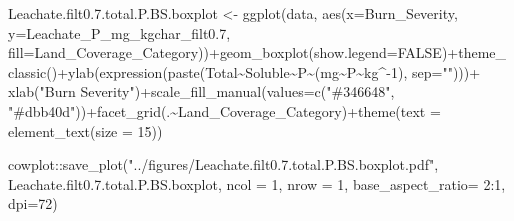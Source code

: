 \documentclass[
]{article}
\newenvironment{Shaded}{\begin{snugshade}}{\end{snugshade}}
\newcommand{\AttributeTok}[1]{\textcolor[rgb]{0.77,0.63,0.00}{#1}}
\newcommand{\ConstantTok}[1]{\textcolor[rgb]{0.00,0.00,0.00}{#1}}
\newcommand{\DecValTok}[1]{\textcolor[rgb]{0.00,0.00,0.81}{#1}}
\newcommand{\FloatTok}[1]{\textcolor[rgb]{0.00,0.00,0.81}{#1}}
\newcommand{\FunctionTok}[1]{\textcolor[rgb]{0.00,0.00,0.00}{#1}}
\newcommand{\NormalTok}[1]{#1}
\newcommand{\OtherTok}[1]{\textcolor[rgb]{0.56,0.35,0.01}{#1}}
\newcommand{\SpecialCharTok}[1]{\textcolor[rgb]{0.00,0.00,0.00}{#1}}
\newcommand{\StringTok}[1]{\textcolor[rgb]{0.31,0.60,0.02}{#1}}
\begin{document}
\begin{Shaded}
\begin{Highlighting}[]
\NormalTok{Leachate.filt0.}\FloatTok{7.}\NormalTok{total.P.BS.boxplot }\OtherTok{\textless{}{-}} \FunctionTok{ggplot}\NormalTok{(data, }\FunctionTok{aes}\NormalTok{(}\AttributeTok{x=}\NormalTok{Burn\_Severity, }\AttributeTok{y=}\NormalTok{Leachate\_P\_mg\_kgchar\_filt0}\FloatTok{.7}\NormalTok{, }\AttributeTok{fill=}\NormalTok{Land\_Coverage\_Category))}\SpecialCharTok{+}\FunctionTok{geom\_boxplot}\NormalTok{(}\AttributeTok{show.legend=}\ConstantTok{FALSE}\NormalTok{)}\SpecialCharTok{+}\FunctionTok{theme\_classic}\NormalTok{()}\SpecialCharTok{+}\FunctionTok{ylab}\NormalTok{(}\FunctionTok{expression}\NormalTok{(}\FunctionTok{paste}\NormalTok{(Total}\SpecialCharTok{\textasciitilde{}}\NormalTok{Soluble}\SpecialCharTok{\textasciitilde{}}\NormalTok{P}\SpecialCharTok{\textasciitilde{}}\NormalTok{(mg}\SpecialCharTok{\textasciitilde{}}\NormalTok{P}\SpecialCharTok{\textasciitilde{}}\NormalTok{kg}\SpecialCharTok{\^{}{-}}\DecValTok{1}\NormalTok{), }\AttributeTok{sep=}\StringTok{""}\NormalTok{)))}\SpecialCharTok{+} \FunctionTok{xlab}\NormalTok{(}\StringTok{"Burn Severity"}\NormalTok{)}\SpecialCharTok{+}\FunctionTok{scale\_fill\_manual}\NormalTok{(}\AttributeTok{values=}\FunctionTok{c}\NormalTok{(}\StringTok{"\#346648"}\NormalTok{, }\StringTok{"\#dbb40d"}\NormalTok{))}\SpecialCharTok{+}\FunctionTok{facet\_grid}\NormalTok{(.}\SpecialCharTok{\textasciitilde{}}\NormalTok{Land\_Coverage\_Category)}\SpecialCharTok{+}\FunctionTok{theme}\NormalTok{(}\AttributeTok{text =} \FunctionTok{element\_text}\NormalTok{(}\AttributeTok{size =} \DecValTok{15}\NormalTok{))}

\NormalTok{cowplot}\SpecialCharTok{::}\FunctionTok{save\_plot}\NormalTok{(}\StringTok{"../figures/Leachate.filt0.7.total.P.BS.boxplot.pdf"}\NormalTok{, Leachate.filt0.}\FloatTok{7.}\NormalTok{total.P.BS.boxplot, }\AttributeTok{ncol =} \DecValTok{1}\NormalTok{, }\AttributeTok{nrow =} \DecValTok{1}\NormalTok{, }\AttributeTok{base\_aspect\_ratio=} \DecValTok{2}\SpecialCharTok{:}\DecValTok{1}\NormalTok{, }\AttributeTok{dpi=}\DecValTok{72}\NormalTok{)}


\end{Highlighting}
\end{Shaded}
\end{document}
